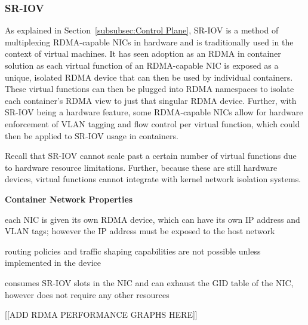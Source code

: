 \documentclass[12pt,titlepage]{article}
\begin{document}
\subsubsection{SR-IOV}
As explained in Section~\ref{subsubsec:Control Plane}, SR-IOV is a method of multiplexing RDMA-capable NICs in hardware and is traditionally used in the context of virtual machines.
It has seen adoption as an RDMA in container solution as each virtual function of an RDMA-capable NIC is exposed as a unique, isolated RDMA device that can then be used by individual containers.
These virtual functions can then be plugged into RDMA namespaces to isolate each container's RDMA view to just that singular RDMA device.
Further, with SR-IOV being a hardware feature, some RDMA-capable NICs allow for hardware enforcement of VLAN tagging and flow control per virtual function, which could then be applied to SR-IOV usage in containers.

Recall that SR-IOV cannot scale past a certain number of virtual functions due to hardware resource limitations.
Further, because these are still hardware devices, virtual functions cannot integrate with kernel network isolation systems.

\noindent
\textbf{Container Network Properties}
\begin{description}[nolistsep,font={{\scshape\bfseries}}]
	\item[Network Isolation] each NIC is given its own RDMA device, which can have its own IP address and VLAN tags; however the IP address must be exposed to the host network
	\item[Controllability] routing policies and traffic shaping capabilities are not possible unless implemented in the device
	\item[Resource Utilization] consumes SR-IOV slots in the NIC and can exhaust the GID table of the NIC, however does not require any other resources
\end{description}

[[ADD RDMA PERFORMANCE GRAPHS HERE]]
\end{document}
